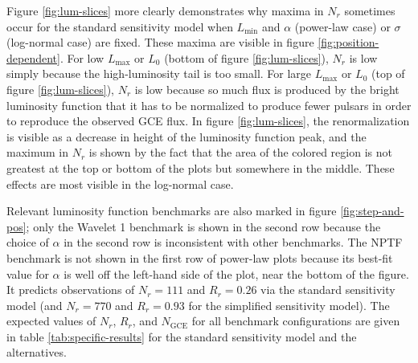 \documentclass[letter,11pt]{article}
\begin{document}
Figure \ref{fig:lum-slices} more clearly demonstrates why maxima in $N_r$ sometimes occur for the standard sensitivity model when $L_\text{min}$ and $\alpha$ (power-law case) or $\sigma$ (log-normal case) are fixed. These maxima are visible in figure \ref{fig:position-dependent}. For low $L_\text{max}$ or $L_0$ (bottom of figure \ref{fig:lum-slices}), $N_r$ is low simply because the high-luminosity tail is too small. For large $L_\text{max}$ or $L_0$ (top of figure \ref{fig:lum-slices}), $N_r$ is low because so much flux is produced by the bright luminosity function that it has to be normalized to produce fewer pulsars in order to reproduce the observed GCE flux. In figure \ref{fig:lum-slices}, the renormalization is visible as a decrease in height of the luminosity function peak, and the maximum in $N_r$ is shown by the fact that the area of the colored region is not greatest at the top or bottom of the plots but somewhere in the middle. These effects are most visible in the log-normal case.

Relevant luminosity function benchmarks are also marked in figure \ref{fig:step-and-pos}; only the Wavelet 1 benchmark is shown in the second row because the choice of $\alpha$ in the second row is inconsistent with other benchmarks. The NPTF benchmark is not shown in the first row of power-law plots because its best-fit value for $\alpha$ is well off the left-hand side of the plot, near the bottom of the figure. It predicts observations of $N_r=111$ and $R_r=0.26$ via the standard sensitivity model (and $N_r = 770$ and $R_r = 0.93$ for the simplified sensitivity model). The expected values of $N_r$, $R_r$, and $N_\text{GCE}$ for all benchmark configurations are given in table \ref{tab:specific-results} for the standard sensitivity model and the alternatives.
\end{document}
